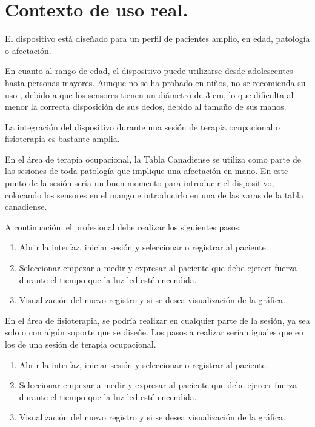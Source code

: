 \section{Contexto de uso real.}
El dispositivo está diseñado para un perfil de pacientes amplio, en edad, patología o afectación.

En cuanto al rango de edad, el dispositivo puede utilizarse desde adolescentes hasta personas mayores. Aunque no se ha probado en niños, no se recomienda su uso , debido a que los sensores tienen un diámetro de 3 cm, lo que dificulta al menor la correcta disposición de sus dedos, debido al tamaño de sus manos.

La integración del dispositivo durante una sesión de terapia ocupacional o fisioterapia es bastante amplia.

En el área de terapia ocupacional, la Tabla Canadiense se utiliza como parte de las sesiones de toda patología que implique una afectación en mano. En este punto de la sesión sería un buen momento para introducir el dispositivo, colocando los sensores en el mango e introducirlo en una de las varas de la tabla canadiense. 

A continuación, el profesional debe realizar los siguientes pasos: 
\begin{enumerate}
    \item Abrir la interfaz, iniciar sesión y seleccionar o registrar al paciente.
    \item Seleccionar empezar a medir y expresar al paciente que debe ejercer fuerza durante el tiempo que la luz led esté encendida.
    \item Visualización del nuevo registro y si se desea visualización de la gráfica. 
\end{enumerate}

En el área de fisioterapia, se podría realizar en cualquier parte de la sesión, ya sea solo o con algún soporte que se diseñe. Los pasos a realizar serían iguales que en los de una sesión de terapia ocupacional. 
\begin{enumerate}
    \item Abrir la interfaz, iniciar sesión y seleccionar o registrar al paciente.
    \item Seleccionar empezar a medir y expresar al paciente que debe ejercer fuerza durante el tiempo que la luz led esté encendida.
    \item Visualización del nuevo registro y si se desea visualización de la gráfica. 
\end{enumerate}

